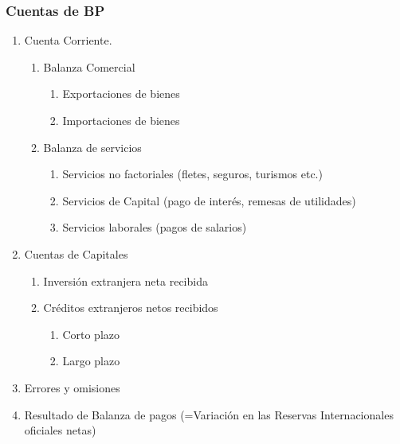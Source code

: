 \documentclass[10pt, xcolor=table, x11names]{beamer}
\begin{document}
	\begin{frame}[label=Cuentas de BP]
		\frametitle{{\normalsize Cuentas de BP} {}}
		\begin{enumerate}
			\item Cuenta Corriente.
			\begin{enumerate}
				\item Balanza Comercial
				\begin{enumerate}
					\item Exportaciones de bienes
					\item Importaciones de bienes
				\end{enumerate}
				\item Balanza de servicios
				\begin{enumerate}
					\item Servicios no factoriales (fletes, seguros, turismos etc.)
					\item Servicios de Capital (pago de interés, remesas de utilidades)
					\item Servicios laborales (pagos de salarios)
				\end{enumerate}
			\end{enumerate}	
				\item Cuentas de Capitales
				\begin{enumerate}
					\item Inversión extranjera neta recibida
					\item Créditos extranjeros netos recibidos
					\begin{enumerate}
						\item Corto plazo
						\item Largo plazo
					\end{enumerate}
				\end{enumerate}	
				\item Errores y omisiones 
				\item Resultado de Balanza de pagos (=Variación en las Reservas Internacionales oficiales netas)
			\end{enumerate}
	\end{frame}
	
\end{document}
